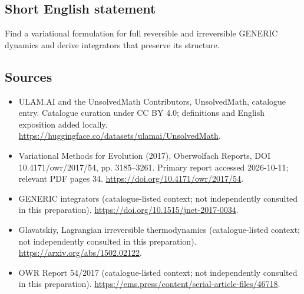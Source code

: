 \documentclass[11pt]{article}
\begin{document}
\subsection{Short English statement}
Find a variational formulation for full reversible and irreversible GENERIC dynamics and derive integrators that preserve its structure.
\subsection{Sources}
\begin{itemize}
\item[\hypertarget{source:statement:1}{S1}] ULAM.AI and the UnsolvedMath Contributors, UnsolvedMath, catalogue entry. Catalogue curation under CC BY 4.0; definitions and English exposition added locally.
\url{https://huggingface.co/datasets/ulamai/UnsolvedMath}.
\item[\hypertarget{source:statement:2}{S2}] Variational Methods for Evolution (2017), Oberwolfach Reports, DOI 10.4171/owr/2017/54, pp. 3185--3261. Primary report accessed 2026-10-11; relevant PDF pages 34.
\url{https://doi.org/10.4171/owr/2017/54}.
\item[\hypertarget{source:statement:3}{S3}] GENERIC integrators (catalogue-listed context; not independently consulted in this preparation).
\url{https://doi.org/10.1515/jnet-2017-0034}.
\item[\hypertarget{source:statement:4}{S4}] Glavatskiy, Lagrangian irreversible thermodynamics (catalogue-listed context; not independently consulted in this preparation).
\url{https://arxiv.org/abs/1502.02122}.
\item[\hypertarget{source:statement:5}{S5}] OWR Report 54/2017 (catalogue-listed context; not independently consulted in this preparation).
\url{https://ems.press/content/serial-article-files/46718}.
\end{itemize}
\label{end:statement}
\end{document}
